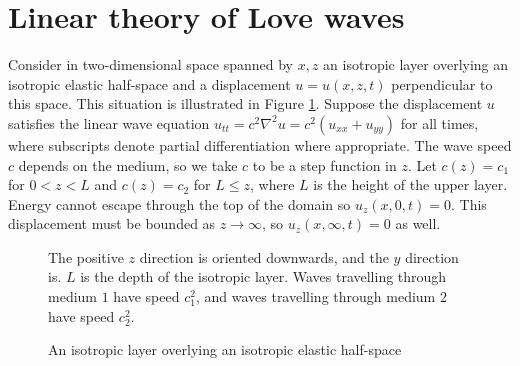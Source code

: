 \documentclass[11pt,letter,subeqn,fleqn]{article}
\numberwithin{equation}{section}
\numberwithin{table}{section}
\numberwithin{figure}{section}
\begin{document}





\section{Linear theory of Love waves}
Consider in two-dimensional space spanned by $x,z$ an isotropic layer overlying an isotropic elastic half-space and a
displacement $u = u(x,z,t)$ perpendicular to this space. This situation is illustrated in Figure \ref{fig:setup}.
Suppose the displacement $u$ satisfies the linear wave equation $u_{tt}=c^2\nabla^2u = c^2\left(u_{xx} + u_{yy}\right)$
for all times, where subscripts denote partial differentiation where appropriate. The wave speed $c$ depends on the medium,
so we take $c$ to be a step function in $z$. Let $c(z) = c_1$ for $0 < z < L$ and $c(z) = c_2$ for $L \leq z$, where $L$
is the height of the upper layer. Energy cannot escape through the top of the domain so $u_z(x,0,t) = 0$. This displacement
must be bounded as $z\to\infty$, so $u_z(x,\infty,t) = 0$ as well.

\begin{figure}[htbp]
	\caption{An isotropic layer overlying an isotropic elastic half-space}
	\label{fig:setup}
\footnotesize
\centering

The positive $z$ direction is oriented downwards, and the $y$ direction is. $L$ is the depth of the isotropic layer.
Waves travelling through medium $1$ have speed $c_1^2$, and waves travelling through medium $2$
have speed $c_2^2$.

\end{figure}
\end{document}
